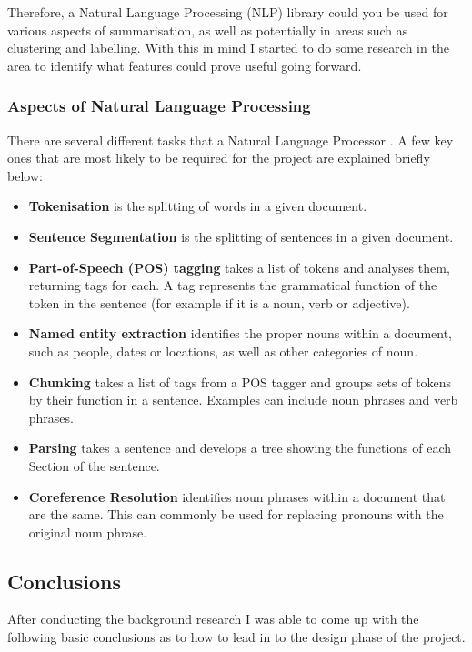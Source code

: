 \documentclass[12pt]{article}
\begin{document}
Therefore, a Natural Language Processing (NLP) library could you be used for various aspects of summarisation, as well as potentially in areas such as clustering and labelling. With this in mind I started to do some research in the area to identify what features could prove useful going forward.

\subsubsection{Aspects of Natural Language Processing} 

\label{nlptypes}

There are several different tasks that a Natural Language Processor \cite{nlpwiki}. A few key ones that are most likely to be required for the project are explained briefly below: 

\begin{itemize}
	\item \textbf{Tokenisation} is the splitting of words in a given document. 
	\item \textbf{Sentence Segmentation} is the splitting of sentences in a given document. 
	\item \textbf{Part-of-Speech (POS) tagging} takes a list of tokens and analyses them, returning tags for each. A tag represents the grammatical function of the token in the sentence (for example if it is a noun, verb or adjective). 
	\item \textbf{Named entity extraction} identifies the proper nouns within a document, such as people, dates or locations, as well as other categories of noun. 
	\item \textbf{Chunking} takes a list of tags from a POS tagger and groups sets of tokens by their function in a sentence. Examples can include noun phrases and verb phrases. 
	\item \textbf{Parsing} takes a sentence and develops a tree showing the functions of each Section of the sentence. 
	\item \textbf{Coreference Resolution} identifies noun phrases within a document that are the same. This can commonly be used for replacing pronouns with the original noun phrase. 
\end{itemize}

\subsection{Conclusions}

After conducting the background research I was able to come up with the following basic conclusions as to how to lead in to the design phase of the project.
\end{document}
